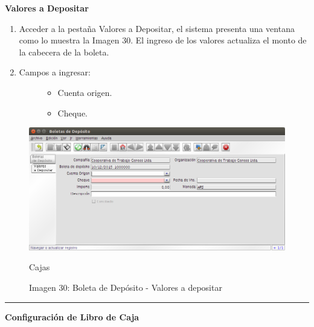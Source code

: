 \documentclass[letterpaper,10pt,spanish]{sphinxmanual}
\begin{document}
\textbf{Valores a Depositar}
\begin{enumerate}
\item {} 
Acceder a la pestaña Valores a Depositar, el sistema presenta una ventana como lo muestra la Imagen 30. El ingreso de los valores actualiza el monto de la cabecera de la boleta.

\item {} \begin{description}
\item[{Campos a ingresar:}] \leavevmode\begin{itemize}
\item {} 
Cuenta origen.

\item {} 
Cheque.

\end{itemize}

\end{description}

\end{enumerate}
\begin{figure}[htbp]
\centering
\capstart

\includegraphics{ly_bancos_30.png}
\caption{Imagen 30: Boleta de Depósito - Valores a depositar}{\small 
Cajas
}\end{figure}


\bigskip\hrule{}\bigskip


\textbf{Configuración de Libro de Caja}
\end{document}
